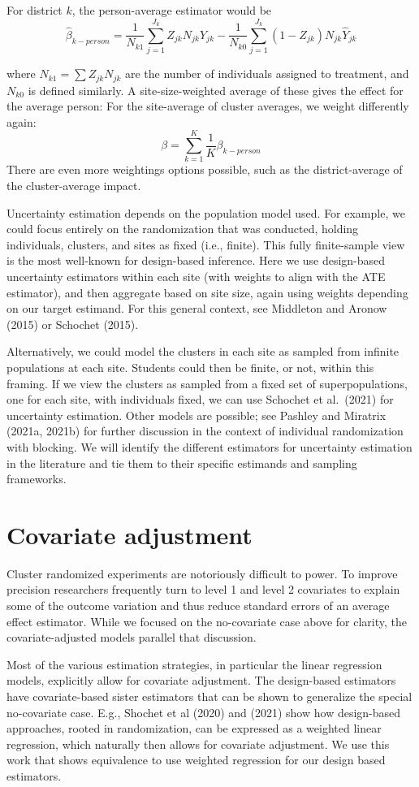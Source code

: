 \documentclass[]{article}
\begin{document}
For district $k$, the person-average estimator would be \[
\hat{\beta}_{k-person} = \frac{1}{N_{k1}} \sum_{j=1}^{J_k} Z_{jk} N_{jk} \widehat{Y}_{jk} - \frac{1}{N_{k0}} \sum_{j=1}^{J_k} (1-Z_{jk}) N_{jk} \hat{Y}_{jk} 
\]

where $N_{k1} = \sum Z_{jk} N_{jk}$ are the number of individuals
assigned to treatment, and $N_{k0}$ is defined similarly. A
site-size-weighted average of these gives the effect for the average
person: For the site-average of cluster averages, we weight differently
again: \[
\beta = \sum_{k=1}^K \frac{1}{K} \beta_{k-person} 
\] There are even more weightings options possible, such as the
district-average of the cluster-average impact.



Uncertainty estimation depends on the population model used. For
example, we could focus entirely on the randomization that was
conducted, holding individuals, clusters, and sites as fixed (i.e.,
finite). This fully finite-sample view is the most well-known for
design-based inference. Here we use design-based uncertainty estimators
within each site (with weights to align with the ATE estimator), and
then aggregate based on site size, again using weights depending on our
target estimand. For this general context, see Middleton and Aronow
(2015) or Schochet (2015).

Alternatively, we could model the clusters in each site as sampled from
infinite populations at each site. Students could then be finite, or
not, within this framing. If we view the clusters as sampled from a
fixed set of superpopulations, one for each site, with individuals
fixed, we can use Schochet et al.~(2021) for uncertainty estimation.
Other models are possible; see Pashley and Miratrix (2021a, 2021b) for
further discussion in the context of individual randomization with
blocking. We will identify the different estimators for uncertainty
estimation in the literature and tie them to their specific estimands
and sampling frameworks.




\section{Covariate adjustment}\label{covariate-adjustment}

Cluster randomized experiments are notoriously difficult to power. To
improve precision researchers frequently turn to level 1 and level 2
covariates to explain some of the outcome variation and thus reduce
standard errors of an average effect estimator. While we focused on the
no-covariate case above for clarity, the covariate-adjusted models
parallel that discussion.

Most of the various estimation strategies, in particular the linear
regression models, explicitly allow for covariate adjustment. The
design-based estimators have covariate-based sister estimators that can
be shown to generalize the special no-covariate case. E.g., Shochet et
al (2020) and (2021) show how design-based approaches, rooted in
randomization, can be expressed as a weighted linear regression, which
naturally then allows for covariate adjustment. We use this work that
shows equivalence to use weighted regression for our design based
estimators.
\end{document}
